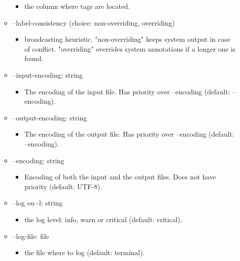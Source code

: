 \documentclass[manual-fr.tex]{subfiles}
\begin{document}
\begin{itemize}
\begin{itemize}
\begin{itemize}
                    \item[] the column where tags are located.
                \end{itemize}
            \item[] --label-consistency (choice: non-overriding, overriding)
                \begin{itemize}
                    \item[] broadcasting heuristic. "non-overriding" keeps system output in case of conflict. "overriding" overrides system annotations if a longer one is found.
                \end{itemize}
            \item[] --input-encoding: string
                \begin{itemize}
                    \item[] The encoding of the input file. Has priority over --encoding (default: --encoding).
                \end{itemize}
            \item[] --output-encoding: string
                \begin{itemize}
                    \item[] The encoding of the output file. Has priority over --encoding (default: --encoding).
                \end{itemize}
            \item[] --encoding: string
                \begin{itemize}
                    \item[] Encoding of both the input and the output files. Does not have priority (default: UTF-8).
                \end{itemize}
            \item[] --log ou -l: string
                \begin{itemize}
                    \item[] the log level: info, warn or critical (default: critical).
                \end{itemize}
            \item[] --log-file: file
                \begin{itemize}
                    \item[] the file where to log (default: terminal).
                \end{itemize}
        \end{itemize}
\end{itemize}
\end{document}
